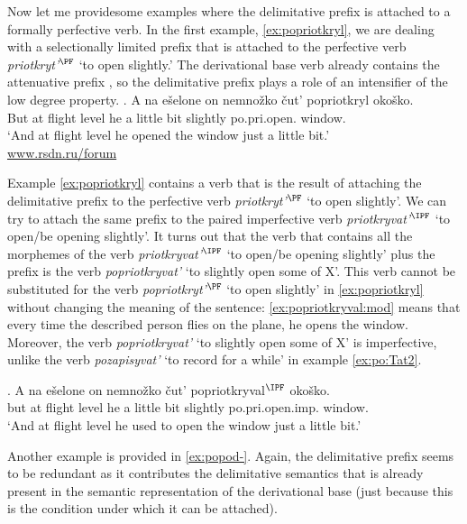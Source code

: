 Now let me providesome examples where the delimitative prefix  is attached to a formally perfective verb. In the first example, \ref{ex:popriotkryl}, we are dealing with a selectionally limited prefix  that is attached to the perfective verb \textit{priotkryt'}$^{\PF}$ `to open slightly.' The derivational base verb already contains the attenuative prefix , so the delimitative prefix  plays a role of an intensifier of the low degree property. 
\exg. \label{ex:popriotkryl}A na e\v{s}elone on nemno\v{z}ko \v{c}ut' popriotkryl oko\v{s}ko.\\
But at {flight level} he {a little bit} {slightly} po.pri.open. window.\\
\trans `And at flight level he opened the window just a little bit.'\\\hbox{}\hfill\hbox{\url{www.rsdn.ru/forum}}

Example \ref{ex:popriotkryl} contains a verb that is the result of attaching the delimitative prefix  to the perfective verb \textit{priotkryt'}$^{\PF}$ `to open slightly'. We can try to attach the same prefix to the paired imperfective verb \textit{priotkryvat'}$^{\IPF}$ `to open/be opening slightly'. It turns out that the verb that contains all the morphemes of the verb \textit{priotkryvat'}$^{\IPF}$ `to open/be opening slightly' plus the prefix  is the verb \textit{popriotkryvat'} `to slightly open some of X'. This verb cannot be substituted for the verb \textit{popriotkryt'}$^{\PF}$ `to open slightly' in \ref{ex:popriotkryl} without changing the meaning of the sentence: \ref{ex:popriotkryval:mod} means that every time the described person flies on the plane, he opens the window. Moreover, the verb \textit{popriotkryvat'} `to slightly open some of X' is imperfective, unlike the verb \textit{pozapisyvat'} `to record for a while' in example \ref{ex:po:Tat2}.

\exg. \label{ex:popriotkryval:mod}A na e\v{s}elone on nemno\v{z}ko \v{c}ut' popriotkryval$^{\IPF}$ oko\v{s}ko.\\
but at {flight level} he {a little bit} {slightly} po.pri.open.imp. window.\\
\trans `And at flight level he used to open the window just a little bit.'

Another example is provided in \ref{ex:popod-}. Again, the delimitative prefix  seems to be redundant as it contributes the delimitative semantics that is already present in the semantic representation of the derivational base (just because this is the condition under which it can be attached).

